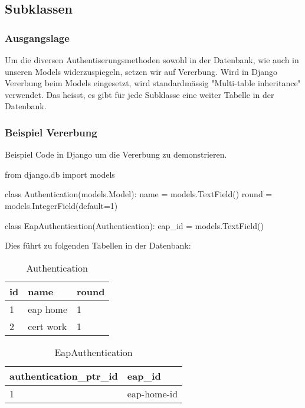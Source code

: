 \subsection{Subklassen}
\label{subklassen}
\subsubsection{Ausgangslage}
Um die diversen Authentiserungsmethoden sowohl in der Datenbank, wie auch in unseren Models widerzuspiegeln, setzen wir auf Vererbung. Wird in Django Vererbung beim Models eingesetzt, wird standardmässig "Multi-table inheritance" verwendet. Das heisst, es gibt für jede Subklasse eine weiter Tabelle in der Datenbank.

\subsubsection{Beispiel Vererbung}
Beispiel Code in Django um die Vererbung zu demonstrieren.
\medskip
\begin{python}
from django.db import models

class Authentication(models.Model):
    name = models.TextField()
    round = models.IntegerField(default=1)

class EapAuthentication(Authentication):
    eap_id = models.TextField()
\end{python}

\medskip
Dies führt zu folgenden Tabellen in der Datenbank:\\

\begin{table}[H]
	\centering
    \begin{tabular}{|p{3cm}|p{3cm}|p{3cm}|}
    \hline    
    \rowcolor{lightblue}
	id & name & round \\ \hline   
	1 & eap home & 1 \\ \hline
	2 & cert work & 1 \\ \hline
    \end{tabular}
    \caption[Authentication]{Authentication}
\end{table}
\vspace*{1 cm}
\begin{table}[H]
	\centering
    \begin{tabular}{|p{4.5cm}|p{4.5cm}|}
    \hline    
    \rowcolor{lightblue}
	authentication\_ptr\_id & eap\_id \\ \hline   
	1 & eap-home-id  \\ \hline
    \end{tabular}
    \caption[EapAuthentication]{EapAuthentication}
\end{table}
\medskip

